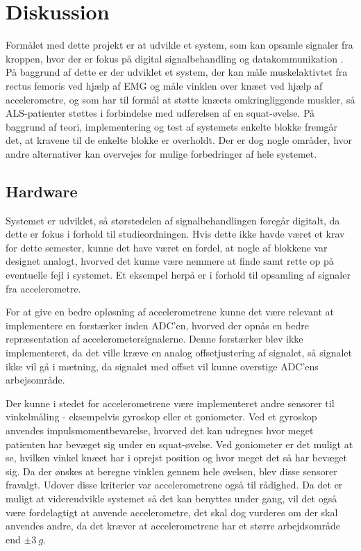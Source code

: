 \section{Diskussion}
Formålet med dette projekt er at udvikle et system, som kan opsamle signaler fra kroppen, hvor der er fokus på digital signalbehandling og datakommunikation \citep{aalborguniversitet2014}. På baggrund af dette er der udviklet et system, der kan måle muskelaktivtet fra rectus femoris ved hjælp af EMG og måle vinklen over knæet ved hjælp af accelerometre, og som har til formål at støtte knæets omkringliggende muskler, så ALS-patienter støttes i forbindelse med udførelsen af en squat-øvelse. På baggrund af teori, implementering og test af systemets enkelte blokke fremgår det, at kravene til de enkelte blokke er overholdt. Der er dog nogle områder, hvor andre alternativer kan overvejes for mulige forbedringer af hele systemet. 

\subsection{Hardware}
Systemet er udviklet, så størstedelen af signalbehandlingen foregår digitalt, da dette er fokus i forhold til studieordningen. Hvis dette ikke havde været et krav for dette semester, kunne det have været en fordel, at nogle af blokkene var designet analogt, hvorved det kunne være nemmere at finde samt rette op på eventuelle fejl i systemet. Et eksempel herpå er i forhold til opsamling af signaler fra accelerometre. 

For at give en bedre opløsning af accelerometrene kunne det være relevant at implementere en forstærker inden ADC'en, hvorved der opnås en bedre repræsentation af accelerometersignalerne. Denne forstærker blev ikke implementeret, da det ville kræve en analog offsetjustering af signalet, så signalet ikke vil gå i mætning, da signalet med offset vil kunne overstige ADC'ens arbejsområde. %

Der kunne i stedet for accelerometrene være implementeret andre sensorer til vinkelmåling - eksempelvis gyroskop eller et goniometer. Ved et gyroskop anvendes impulsmomentbevarelse, hvorved det kan udregnes hvor meget patienten har bevæget sig under en squat-øvelse. Ved goniometer er det muligt at se, hvilken vinkel knæet har i oprejst position og hvor meget det så har bevæget sig. Da der ønskes at beregne vinklen gennem hele øvelsen, blev disse sensorer fravalgt. Udover disse kriterier  var accelerometrene også til rådighed. Da det er muligt at videreudvikle systemet så det kan benyttes under gang, vil det også være fordelagtigt at anvende accelerometre, det skal dog vurderes om der skal anvendes andre, da det kræver at accelerometrene har et større arbejdsområde end $\pm3~g$.

